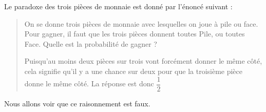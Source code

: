 \documentclass{exam}
\begin{document}
\begin{questions}
    \question Le paradoxe des trois pièces de monnaie est donné par l'énoncé suivant :
    \begin{quote}
    \og On se donne trois pièces de monnaie avec lesquelles on joue à pile ou face. Pour gagner, il faut que les trois pièces donnent toutes Pile, ou toutes Face. Quelle est la probabilité de gagner ?
    
    Puisqu'au moins deux pièces sur trois vont forcément donner le même côté, cela signifie qu'il y a une chance sur deux pour que la troisième pièce donne le même côté. La réponse est donc $\dfrac{1}{2}$\fg
    \end{quote} 
    Nous allons voir que ce raisonnement est faux.
    \end{questions}
\end{document}

